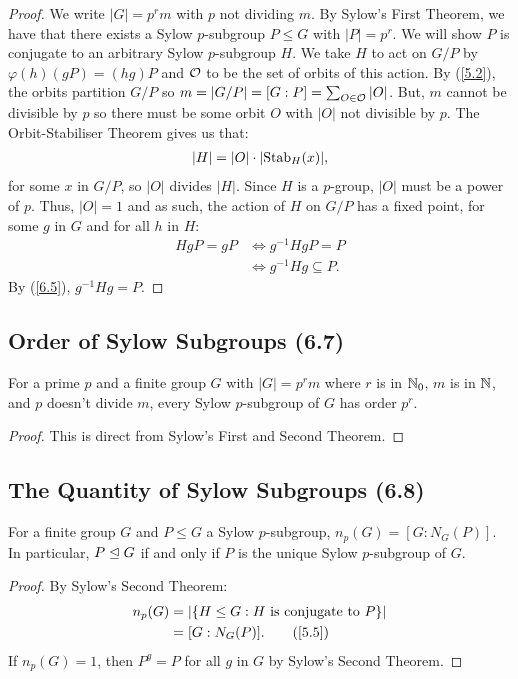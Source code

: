 \begin{proof}
    We write $|G| = p^rm$ with $p$ not dividing $m$.
    By Sylow's First Theorem, we have that there exists
    a Sylow $p$-subgroup $P \leq G$ with $|P| = p^r$.
    We will show $P$ is conjugate to an arbitrary Sylow
    $p$-subgroup $H$.
    We take $H$ to act on $G / P$ by $\varphi(h)(gP) = (hg)P$
    and $\mathcal{O}$ to be the set of orbits of this action.
    By (\ref{5.2}), the orbits partition $G / P$ so 
    $m = |G / P| = [G : P] = \sum_{O \in \mathcal{O}} |O|$. But, $m$
    cannot be divisible by $p$ so there must be some orbit
    $O$ with $|O|$ not divisible by $p$.
    The Orbit-Stabiliser Theorem gives us that: \begin{align*}
        |H| = |O| \cdot |\!\operatorname{Stab}_H(x)|,
    \end{align*} for some $x$ in $G / P$, so $|O|$ divides
    $|H|$. Since $H$ is a $p$-group, $|O|$ must be a power
    of $p$. Thus, $|O| = 1$ and as such, the action of $H$ on 
    $G / P$ has a fixed point, for some $g$ in $G$ and for 
    all $h$ in $H$: \begin{align*}
        HgP = gP
        & \Longleftrightarrow g^{-1}HgP = P \\
        & \Longleftrightarrow g^{-1}Hg \subseteq P.
    \end{align*} By (\ref{6.5}), $g^{-1}Hg = P$.
\end{proof}

\subsection{Order of Sylow Subgroups (6.7)}  \label{6.7}

For a prime $p$ and a finite group $G$ with $|G| = p^rm$
where $r$ is in $\mathbb{N}_0$, $m$ is in $\mathbb{N}$, and 
$p$ doesn't divide $m$, every Sylow $p$-subgroup of $G$
has order $p^r$. 
\begin{proof}
    This is direct from Sylow's First and Second Theorem.
\end{proof}

\subsection{The Quantity of Sylow Subgroups (6.8)} \label{6.8}

For a finite group $G$ and $P \leq G$ a Sylow $p$-subgroup,
$n_p(G) = [G : N_G(P)]$. In particular, $P \trianglelefteq G$ if and
only if $P$ is the unique Sylow $p$-subgroup of $G$.

\begin{proof}
    By Sylow's Second Theorem: \begin{align*}
        n_p(G) &= |\{H \leq G : H \text{ is conjugate to } P\}| \\
        &= [G : N_G(P)]. \tag{\ref{5.5}}
    \end{align*} If $n_p(G) = 1$, then $P^g = P$ for all $g$ in $G$
    by Sylow's Second Theorem.
\end{proof}

